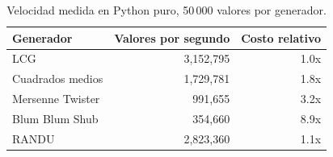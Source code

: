 \begin{table}[htbp]\centering
\caption{Velocidad medida en Python puro, 50\,000 valores por generador.}
\label{tab:velocidad}
\begin{tabular}{l|r|r}
\toprule
Generador & Valores por segundo & Costo relativo \\
\midrule
LCG & 3{,}152{,}795 & 1.0x \\
Cuadrados medios & 1{,}729{,}781 & 1.8x \\
Mersenne Twister & 991{,}655 & 3.2x \\
Blum Blum Shub & 354{,}660 & 8.9x \\
RANDU & 2{,}823{,}360 & 1.1x \\
\bottomrule
\end{tabular}
\end{table}
